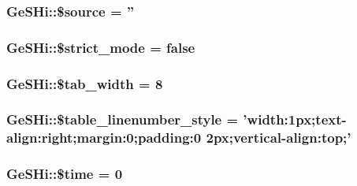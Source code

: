 \hypertarget{class_ge_s_hi_a1eb6a637d5335373434bd750206a6695}{
\subsubsection[{\$source}]{\setlength{\rightskip}{0pt plus 5cm}Ge\-S\-Hi\-::\$source = ''}}\label{class_ge_s_hi_a1eb6a637d5335373434bd750206a6695}
\hypertarget{class_ge_s_hi_a6cd5db593015553b900fdfab3968b6c6}{
\subsubsection[{\$strict\-\_\-mode}]{\setlength{\rightskip}{0pt plus 5cm}Ge\-S\-Hi\-::\$strict\-\_\-mode = false}}\label{class_ge_s_hi_a6cd5db593015553b900fdfab3968b6c6}
\hypertarget{class_ge_s_hi_ab5f2488b968d378bdaee6127e7284a65}{
\subsubsection[{\$tab\-\_\-width}]{\setlength{\rightskip}{0pt plus 5cm}Ge\-S\-Hi\-::\$tab\-\_\-width = 8}}\label{class_ge_s_hi_ab5f2488b968d378bdaee6127e7284a65}
\hypertarget{class_ge_s_hi_a334700e28e7643be6d7cb8f63e96d24f}{
\subsubsection[{\$table\-\_\-linenumber\-\_\-style}]{\setlength{\rightskip}{0pt plus 5cm}Ge\-S\-Hi\-::\$table\-\_\-linenumber\-\_\-style = 'width\-:1px;text-\/align\-:right;margin\-:0;padding\-:0 2px;vertical-\/align\-:top;'}}\label{class_ge_s_hi_a334700e28e7643be6d7cb8f63e96d24f}
\hypertarget{class_ge_s_hi_a08f4ce3138dd5f72c9f157941b614a2b}{
\subsubsection[{\$time}]{\setlength{\rightskip}{0pt plus 5cm}Ge\-S\-Hi\-::\$time = 0}}\label{class_ge_s_hi_a08f4ce3138dd5f72c9f157941b614a2b}
